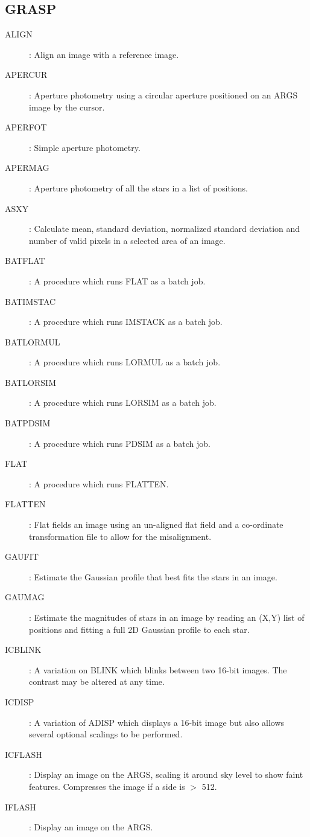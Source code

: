 \subsection {GRASP}
\begin{description}
\begin{description}
\item [ALIGN]: Align an image with a reference image.
\item [APERCUR]: Aperture photometry using a circular aperture positioned on an
ARGS image by the cursor.
\item [APERFOT]: Simple aperture photometry.
\item [APERMAG]: Aperture photometry of all the stars in a list of positions.
\item [ASXY]: Calculate mean, standard deviation, normalized standard deviation
and number of valid pixels in a selected area of an image.
\item [BATFLAT]: A procedure which runs FLAT as a batch job.
\item [BATIMSTAC]: A procedure which runs IMSTACK as a batch job.
\item [BATLORMUL]: A procedure which runs LORMUL as a batch job.
\item [BATLORSIM]: A procedure which runs LORSIM as a batch job.
\item [BATPDSIM]: A procedure which runs PDSIM as a batch job.
\item [FLAT]: A procedure which runs FLATTEN.
\item [FLATTEN]: Flat fields an image using an un-aligned flat field and a
co-ordinate transformation file to allow for the misalignment.
\item [GAUFIT]: Estimate the Gaussian profile that best fits the stars in an
image.
\item [GAUMAG]: Estimate the magnitudes of stars in an image by reading an
(X,Y) list of positions and fitting a full 2D Gaussian profile to each star.
\item [ICBLINK]: A variation on BLINK which blinks between two 16-bit images.
The contrast may be altered at any time.
\item [ICDISP]: A variation of ADISP which displays a 16-bit image but also
allows several optional scalings to be performed.
\item [ICFLASH]: Display an image on the ARGS, scaling it around sky level to
show faint features.
Compresses the image if a side is $>$ 512.
\item [IFLASH]: Display an image on the ARGS.

\end{description}
\end{description}

